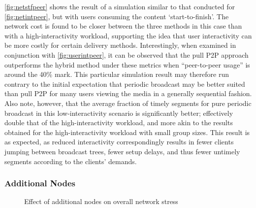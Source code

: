 \autoref{fig:netstfpeer} shows the result of a simulation similar to that conducted for \autoref{fig:netintpeer}, but with users consuming the content `start-to-finish'. The network cost is found to be closer between the three methods in this case than with a high-interactivity workload, supporting the idea that user interactivity can be more costly for certain delivery methods. Interestingly, when examined in conjunction with \autoref{fig:userintpeer}, it can be observed that the pull P2P approach outperforms the hybrid method under these metrics when ``peer-to-peer usage'' is around the 40\% mark. This particular simulation result may therefore run contrary to the initial expectation that periodic broadcast may be better suited than pull P2P for many users viewing the media in a generally sequential fashion. Also note, however, that the average fraction of timely segments for pure periodic broadcast in this low-interactivity scenario is significantly better; effectively double that of the high-interactivity workload, and more akin to the results obtained for the high-interactivity workload with small group sizes. This result is as expected, as reduced interactivity correspondingly results in fewer clients jumping between broadcast trees, fewer setup delays, and thus fewer untimely segments according to the clients' demands.

\subsubsection{Additional Nodes}

\begin{figure}[t]
    \centering

    \caption{Effect of additional nodes on overall network stress}
\end{figure}

